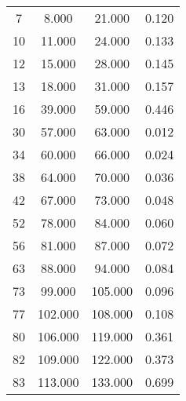 % 
\begin{tabular}{cccc}
  \hline
  \hline
7 & 8.000 & 21.000 & 0.120 \\ 
  10 & 11.000 & 24.000 & 0.133 \\ 
  12 & 15.000 & 28.000 & 0.145 \\ 
  13 & 18.000 & 31.000 & 0.157 \\ 
  16 & 39.000 & 59.000 & 0.446 \\ 
  30 & 57.000 & 63.000 & 0.012 \\ 
  34 & 60.000 & 66.000 & 0.024 \\ 
  38 & 64.000 & 70.000 & 0.036 \\ 
  42 & 67.000 & 73.000 & 0.048 \\ 
  52 & 78.000 & 84.000 & 0.060 \\ 
  56 & 81.000 & 87.000 & 0.072 \\ 
  63 & 88.000 & 94.000 & 0.084 \\ 
  73 & 99.000 & 105.000 & 0.096 \\ 
  77 & 102.000 & 108.000 & 0.108 \\ 
  80 & 106.000 & 119.000 & 0.361 \\ 
  82 & 109.000 & 122.000 & 0.373 \\ 
  83 & 113.000 & 133.000 & 0.699 \\ 
   \hline
\end{tabular}

